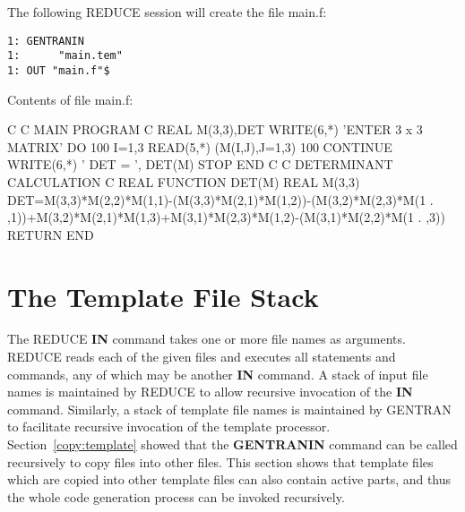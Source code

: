 The following REDUCE session will create the file main.f:
\begin{verbatim}
1: GENTRANIN 
1:      "main.tem" 
1: OUT "main.f"$
\end{verbatim}
Contents of file main.f:
\begin{framedverbatim}
C                                                         
C  MAIN PROGRAM                                           
C                                                         
      REAL M(3,3),DET                                   
      WRITE(6,*) 'ENTER 3 x 3 MATRIX'                     
      DO 100 I=1,3                                        
          READ(5,*) (M(I,J),J=1,3)                        
100   CONTINUE                                            
      WRITE(6,*) ' DET = ', DET(M)                        
      STOP                                                
      END                                                 
C                                                         
C  DETERMINANT CALCULATION                                
C                                                         
      REAL FUNCTION DET(M)                              
      REAL M(3,3)                                       
      DET=M(3,3)*M(2,2)*M(1,1)-(M(3,3)*M(2,1)*M(1,2))-(M(3,2)*M(2,3)*M(1
     . ,1))+M(3,2)*M(2,1)*M(1,3)+M(3,1)*M(2,3)*M(1,2)-(M(3,1)*M(2,2)*M(1
     . ,3))
      RETURN                                              
      END                                                 
\end{framedverbatim} 

\section{The Template File Stack}
\label{template:stack}
The REDUCE {\bf IN} command takes one or more file names as
arguments.  REDUCE reads each of the given files and executes all
statements and commands, any of which may be another {\bf IN}
command.  A stack of input file names is maintained by
REDUCE to allow recursive invocation of the {\bf IN} command.  Similarly,
a stack of template file names is maintained by GENTRAN to facilitate
recursive invocation of the template processor.  Section~\ref{copy:template}
showed that the {\bf GENTRANIN} command can be
called recursively to copy files into other files.  This section shows
that template files which are copied into other template files can also
contain active parts, and thus the whole code generation process can
be invoked recursively.


